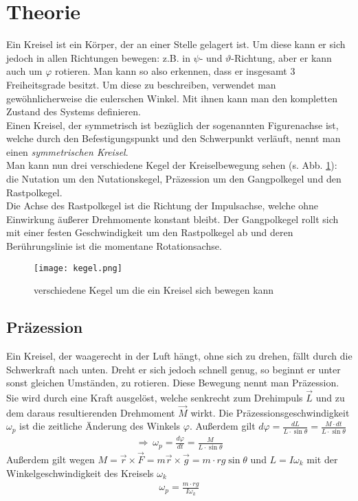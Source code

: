 \documentclass[12pt,a4paper,titlepage,headinclude,bibtotoc]{scrartcl}
\begin{document}
\section{Theorie}
\label{sec:theorie}
Ein Kreisel ist ein Körper, der an einer Stelle gelagert ist.
Um diese kann er sich jedoch in allen Richtungen bewegen: z.B. in $\psi$- und $\vartheta$-Richtung, aber er kann auch um $\varphi$ rotieren.
Man kann so also erkennen, dass er insgesamt 3 Freiheitsgrade besitzt.
Um diese zu beschreiben, verwendet man gewöhnlicherweise die eulerschen Winkel.
Mit ihnen kann man den kompletten Zustand des Systems definieren.\\
Einen Kreisel, der symmetrisch ist bezüglich der sogenannten Figurenachse ist, welche durch den Befestigungspunkt und den Schwerpunkt verläuft, nennt man einen \emph{symmetrischen Kreisel}.\\
Man kann nun drei verschiedene Kegel der Kreiselbewegung sehen (s. Abb. \ref{img:kegel}): die Nutation um den Nutationskegel, Präzession um den Gangpolkegel und den Rastpolkegel.\\
Die Achse des Rastpolkegel ist die Richtung der Impulsachse, welche ohne Einwirkung äußerer Drehmomente konstant bleibt.
Der Gangpolkegel rollt sich mit einer festen Geschwindigkeit um den Rastpolkegel ab und deren Berührungslinie ist die momentane Rotationsachse.


\begin{figure}[h]
\centering
\texttt{[image: kegel.png]}
\caption{verschiedene Kegel um die ein Kreisel sich bewegen kann\protect\footnotemark\label{img:kegel}}
\end{figure}
\footnotetext{%
}
\subsection{Präzession}
Ein Kreisel, der waagerecht in der Luft hängt, ohne sich zu drehen, fällt durch die Schwerkraft nach unten.
Dreht er sich jedoch schnell genug, so beginnt er unter sonst gleichen Umständen, zu rotieren. Diese Bewegung nennt man Präzession.
Sie wird durch eine Kraft ausgelöst, welche senkrecht zum Drehimpuls $\vec L$ und zu dem daraus resultierenden Drehmoment $\vec M$ wirkt.
Die Präzessionsgeschwindigkeit $\omega_p$ ist die zeitliche Änderung des Winkels $\varphi$.
Außerdem gilt $d\varphi=\frac{dL}{L \cdot\sin\theta}=\frac{M\cdot dt}{L \cdot\sin\theta}$
\begin{align*}
\Rightarrow\:\omega_p=\frac{d\varphi}{dt}=\frac{M}{L \cdot\sin\theta}
\end{align*}
Außerdem gilt wegen $M=\vec{r}\times\vec{F}=m\vec{r}\times\vec{g}=m\cdot rg\sin\theta$ und $L=I\omega_k$ mit der Winkelgeschwindigkeit des Kreisels $\omega_k$
\begin{align}
\omega_p=\frac{m\cdot rg}{I\omega_k}
\end{align}
\end{document}
